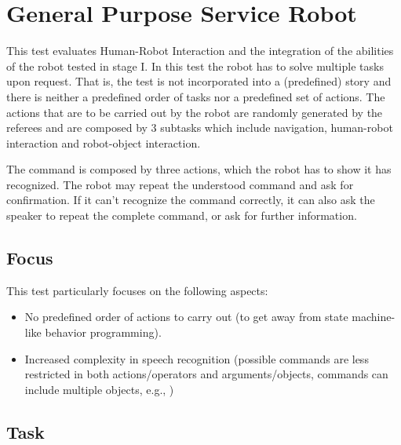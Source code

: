 \section{General Purpose Service Robot}

This test evaluates Human-Robot Interaction and the integration of the abilities of the robot tested in stage I. In this test the robot has to solve multiple tasks upon request. That is, the test is not incorporated into a (predefined) story and there is neither a predefined order of tasks nor a predefined set of actions. The actions that are to be carried out by the robot are randomly generated by the referees and are composed by 3 subtasks which include navigation, human-robot interaction and robot-object interaction.

The command is composed by three actions, which the robot has to show it has recognized. The robot may repeat the understood command and ask for confirmation. If it can't recognize the command correctly, it can also ask the speaker to repeat the complete command, or ask for further information.

\subsection{Focus}
This test particularly focuses on the following aspects:
\begin{itemize}
	\item No predefined order of actions to carry out (to get away from state machine-like behavior programming).
	\item Increased complexity in speech recognition (possible commands are less restricted in both actions/operators and arguments/objects, commands can include multiple objects, e.g., )
\end{itemize}

\subsection{Task}

